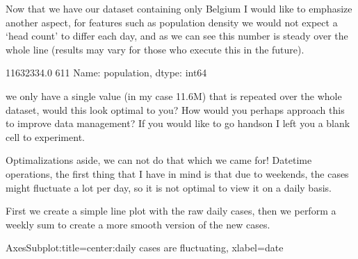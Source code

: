 \documentclass[letterpaper,10pt,english]{jupyterBook}
\begin{document}
\sphinxAtStartPar
Now that we have our dataset containing only Belgium I would like to emphasize another aspect, for features such as population density we would not expect a ‘head count’ to differ each day, and as we can see this number is steady over the whole line (results may vary for those who execute this in the future).

\begin{sphinxVerbatim}[commandchars=\\\{\}]
\end{sphinxVerbatim}

\begin{sphinxVerbatim}[commandchars=\\\{\}]
11632334.0    611
Name: population, dtype: int64
\end{sphinxVerbatim}

\sphinxAtStartPar
we only have a single value (in my case 11.6M) that is repeated over the whole dataset, would this look optimal to you? How would you perhaps approach this to improve data management? If you would like to go hands\sphinxhyphen{}on I left you a blank cell to experiment.

\sphinxAtStartPar
Optimalizations aside, we can not do that which we came for! Datetime operations, the first thing that I have in mind is that due to weekends, the cases might fluctuate a lot per day, so it is not optimal to view it on a daily basis.

\sphinxAtStartPar
First we create a simple line plot with the raw daily cases, then we perform a weekly sum to create a more smooth version of the new cases.

\begin{sphinxVerbatim}[commandchars=\\\{\}]
\PYG{p}{[}\PYG{p}{]}
\end{sphinxVerbatim}

\begin{sphinxVerbatim}[commandchars=\\\{\}]
\PYGZlt{}AxesSubplot:title=\PYGZob{}\PYGZsq{}center\PYGZsq{}:\PYGZsq{}daily cases are fluctuating\PYGZsq{}\PYGZcb{}, xlabel=\PYGZsq{}date\PYGZsq{}\PYGZgt{}
\end{sphinxVerbatim}
\end{document}
